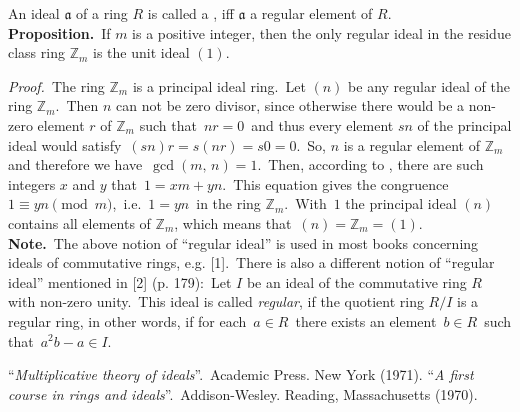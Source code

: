 \documentclass[12pt]{article}
\theoremstyle{definition}
\begin{document}
An ideal $\mathfrak{a}$ of a ring $R$ is called a , iff $\mathfrak{a}$  a regular element of $R$.\\

\textbf{Proposition.}\, If $m$ is a positive integer, then the only regular ideal in the residue class ring $\mathbb{Z}_m$ is the unit ideal $(1)$.

{\em Proof.}\, The ring $\mathbb{Z}_m$ is a principal ideal ring.\, Let $(n)$ be any regular ideal of the ring $\mathbb{Z}_m$.\, Then $n$ can not be zero divisor, since otherwise there would be a non-zero element $r$ of $\mathbb{Z}_m$ such that\, $nr = 0$\, and thus every element $sn$ of the principal ideal would satisfy\, $(sn)r = s(nr)= s0 = 0$.\, So, $n$ is a regular element of $\mathbb{Z}_m$ and therefore we have\, $\gcd(m,\,n) = 1$.\, Then, according to , there are such integers $x$ and $y$ that\, $1 = xm\!+\!yn$.\, This equation gives the congruence\, $1 \equiv yn \pmod{m}$,\, i.e.\, $1 = yn$\, in the ring $\mathbb{Z}_m$.\, With\, $1$ the principal ideal $(n)$ contains all elements of $\mathbb{Z}_m$, which means that\, $(n) = \mathbb{Z}_m = (1)$.\\

\textbf{Note.}\, The above notion of ``regular ideal'' is used in most books concerning ideals of commutative rings, e.g. [1].\, There is also a different notion of ``regular ideal'' mentioned in [2] (p. 179):\, Let $I$ be an ideal of the commutative ring $R$ with non-zero unity.\, This ideal is called {\em regular}, if the quotient ring $R/I$ is a regular ring, in other words, if for each\, $a \in R$\, there exists an element\, $b \in R$\, such that\,
$a^2b\!-\!a \in I$.

\begin{thebibliography}{9}
 ``{\em Multiplicative theory of ideals}''.\, Academic Press. New York (1971).
 ``{\em A first course in rings and ideals}''.\, Addison-Wesley.  Reading, Massachusetts (1970).
\end{thebibliography}
\end{document}
